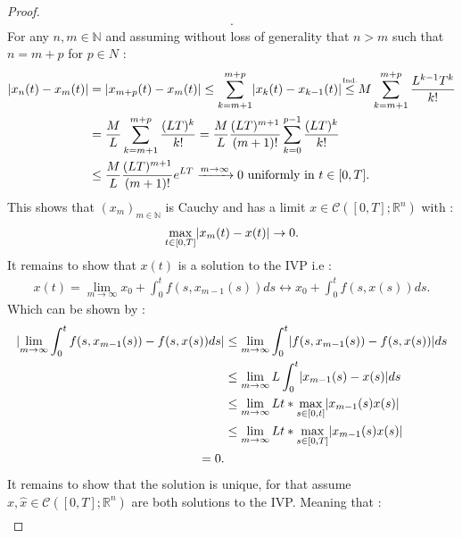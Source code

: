 \begin{proof}[Proof]
\begin{align*}
  .\end{align*}
  For any $n,m \in  \mathbb{N}$ and assuming without loss of generality that  $n>m$ such that $n = m+p$ for $p \in  N$ : 
  \begin{align*}
    \abs{x_{n}(t) - x_{m}(t)} &= \abs{x_{m+p}(t) - x_{m}(t)} \le  \sum_{k=m+1}^{m+p}  \abs{x_k(t)-x_{k-1}(t)} \myS{Ind.}{\le } M \sum_{k=m+1}^{m+p}  \frac{L^{k-1 }T^{k}  }{k!}\\
                              &= \frac{M}{L} \sum_{k=m+1}^{m+p} \frac{(LT)^{k} }{k!}  = \frac{M}{L} \frac{(LT)^{m+1} }{(m+1)!}\sum_{k=0}^{p-1} \frac{(LT)^{k} }{k!}  \\
                              &\le \frac{M}{L} \frac{(LT)^{m+1} }{(m+1)!} e^{LT}  \xrightarrow{m\to \infty} 0 \text{  uniformly in } t \in  [0,T]
  .\end{align*}
  This shows that $(x_m)_{m \in  \mathbb{N}}$  is Cauchy and has a limit $x \in  \mathcal{C}([0,T];\mathbb{R}^{n} )$ with : 
  \begin{align*}
    \max_{t \in  [0,T]} \lvert x_m(t) - x(t)\rvert \to  0
  .\end{align*}
  It remains to show that $x(t)$ is a solution to the IVP i.e : 
  \begin{align*}
    x(t) =  \lim_{m\to \infty} x_0 + \int_0^{t} f(s,x_{m-1}(s)) ds  \leftrightarrow x_0 + \int_0^{t} f(s,x(s)) ds 
  .\end{align*}
 Which can be shown by : 
 \begin{align*}
   \lvert\lim_{m \to \infty} \int_0^{t} f(s,x_{m-1}(s))  - f(s,x(s)) ds \rvert &\le  \lim_{m \to  \infty} \int_0^{t} \lvert f(s,x_{m-1}(s))-f(s,x(s))\rvert ds \\
                                                                         &\le  \lim_{m \to \infty} L \int_0^{t} \lvert x_{m-1}(s)-x(s)\rvert ds \\
                                                                         &\le  \lim_{m \to \infty} L t*\max_{s \in [0,t]} \lvert x_{m-1}(s) x(s)\rvert\\
                                                                         &\le   \lim_{m \to \infty} L t*\max_{s \in [0,T]} \lvert x_{m-1}(s) x(s)\rvert\\
                                                                         = 0 
 .\end{align*}
 It remains to show that the solution is unique, for that assume $x,\hat{x}  \in  \mathcal{C}([0,T];\mathbb{R}^{n} )$ are both solutions to the IVP.
 Meaning that : 
 \begin{align*}

\end{align*}
\end{proof}
